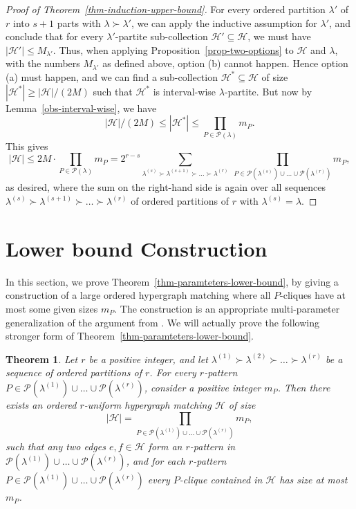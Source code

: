 \documentclass{aic}
\newtheorem{theorem}{Theorem}[section]
\theoremstyle{definition}
\numberwithin{equation}{section}
\numberwithin{figure}{section}
\newcommand{\su}{\subseteq}
\newcommand{\HH}{\mathcal{H}}
\newcommand{\PP}{\mathcal{P}}
\begin{document}
\begin{proof}[Proof of Theorem~\ref{thm-induction-upper-bound}]
    For every ordered partition $\lambda'$ of $r$ into $s+1$ parts with $\lambda\succ\lambda'$, we can apply the inductive assumption for $\lambda'$, and conclude that for every $\lambda'$-partite sub-collection $\HH'\su \HH$, we must have $|\HH'|\le M_{\lambda'}$. Thus, when applying Proposition~\ref{prop-two-options} to $\HH$ and $\lambda$, with the numbers $M_{\lambda'}$ as defined above, option (b) cannot happen. Hence option (a) must happen, and we can find a sub-collection $\HH^*\su \HH$ of size $|\HH^*|\ge |\HH|/(2M)$ such that $\HH^*$ is interval-wise $\lambda$-partite. But now by Lemma~\ref{obs-interval-wise}, we have
    \[|\HH|/(2M)\le |\HH^*|\le \prod_{P\in \PP(\lambda)} m_{P}.\]
    This gives
    \[|\HH|\le 2M\cdot \prod_{P\in \PP(\lambda)} m_{P}=2^{r-s} \sum_{\lambda^{(s)} \succ \lambda^{(s+1)} \succ \dots \succ \lambda^{(r)}}\ \prod_{ P\in \PP(\lambda^{(s)})\cup\dots\cup \PP(\lambda^{(r)}) } m_{P},\]
    as desired, where the sum on the right-hand side is again over all sequences $\lambda^{(s)} \succ \lambda^{(s+1)} \succ \dots \succ \lambda^{(r)}$ of ordered partitions of $r$ with $\lambda^{(s)}=\lambda$.
    \end{proof}


\section{Lower bound Construction}
\label{sect-lower-bound}



In this section, we prove Theorem~\ref{thm-paramteters-lower-bound}, by giving a construction of a large ordered hypergraph matching where all $P$-cliques have at most some given sizes $m_P$. The construction is an appropriate multi-parameter generalization of the argument from \cite[Section 4]{AJKS}. We will actually prove the following stronger form of Theorem~\ref{thm-paramteters-lower-bound}.

\begin{theorem} \label{thm-paramteters-lower-bound-stronger}
Let $r$ be a positive integer, and let $\lambda^{(1)} \succ \lambda^{(2)} \succ \dots \succ \lambda^{(r)}$ be a sequence of ordered partitions of $r$. For every $r$-pattern $P\in \PP(\lambda^{(1)})\cup\dots\cup \PP(\lambda^{(r)})$, consider a positive integer $m_P$. Then there exists an  ordered $r$-uniform hypergraph matching $\HH$ of size
\[|\HH|=\prod_{P\in \PP(\lambda^{(1)})\cup\dots\cup \PP(\lambda^{(r)})} m_{P},\]
such that any two edges $e,f\in \HH$ form an $r$-pattern in $\PP(\lambda^{(1)})\cup\dots\cup \PP(\lambda^{(r)})$, and for each $r$-pattern $P\in \PP(\lambda^{(1)})\cup\dots\cup \PP(\lambda^{(r)})$ every $P$-clique contained in $\HH$ has size at most $m_P$.
\end{theorem}
\end{document}
